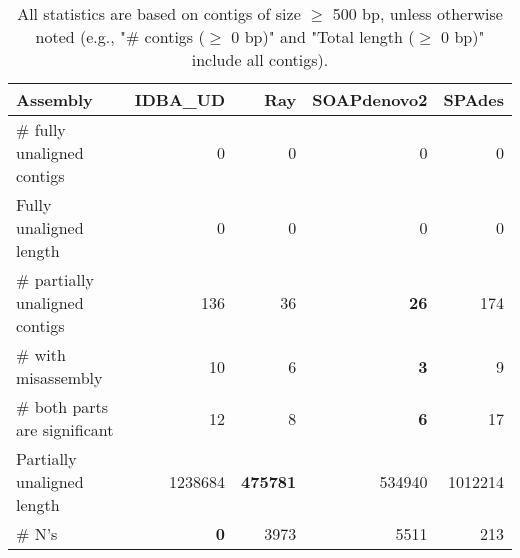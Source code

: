 \documentclass[12pt,a4paper]{article}
\begin{document}
\begin{table}[ht]
\begin{center}
\caption{All statistics are based on contigs of size $\geq$ 500 bp, unless otherwise noted (e.g., "\# contigs ($\geq$ 0 bp)" and "Total length ($\geq$ 0 bp)" include all contigs).}
\begin{tabular}{|l*{4}{|r}|}
\hline
Assembly & IDBA\_UD & Ray & SOAPdenovo2 & SPAdes \\ \hline
\# fully unaligned contigs & 0 & 0 & 0 & 0 \\ \hline
Fully unaligned length & 0 & 0 & 0 & 0 \\ \hline
\# partially unaligned contigs & 136 & 36 & {\bf 26} & 174 \\ \hline
\hspace{5mm}\# with misassembly & 10 & 6 & {\bf 3} & 9 \\ \hline
\hspace{5mm}\# both parts are significant & 12 & 8 & {\bf 6} & 17 \\ \hline
Partially unaligned length & 1238684 & {\bf 475781} & 534940 & 1012214 \\ \hline
\# N's & {\bf 0} & 3973 & 5511 & 213 \\ \hline
\end{tabular}
\end{center}
\end{table}
\end{document}
